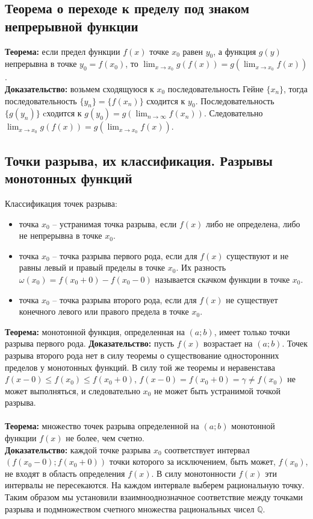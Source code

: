 \documentclass{article}
\newcommand{\theorem}{\textbf{Теорема:} }
\newcommand{\proof}{\textbf{Доказательство:} }
\newcommand{\intr}[2]{$(#1;#2)$}
\newcommand{\Q}{$\mathbb{Q}$}
\begin{document}
    \subsection*{Теорема о переходе к пределу под знаком непрерывной функции}       
        \textbf{Теорема:} если предел функции $f(x)$ точке $x_0$ равен $y_0$, а функция $g(y)$ непрерывна в точке $y_0 = f(x_0)$, то
        $\lim_{x \to x_0} g(f(x)) = g \left(\lim_{x \to x_0} f(x) \right)$.
        \\
        \textbf{Доказательство:}
        возьмем сходящуюся к $x_0$ последовательность Гейне $\{x_n\}$, тогда последовательность $\{y_n\} = \{f(x_n)\}$ сходится к $y_0$.
        Последовательность $\{g(y_n)\}$ cходится к $g(y_0) = g(\lim_{n \to \infty} f(x_n))$.
        Следовательно $\lim_{x \to x_0} g(f(x)) = g \left(\lim_{x \to x_0} f(x) \right)$.


    \subsection*{Точки разрыва, их классификация. Разрывы монотонных функций}
        Классификация точек разрыва:
        \begin{itemize}
            \item точка $x_0$ -- устранимая точка разрыва, если $f(x)$ либо не определена, либо не непрерывна в точке $x_0$.
            \item точка $x_0$ -- точка разрыва первого рода, если для $f(x)$ существуют и не равны левый и правый пределы в точке $x_0$.
            Их разность $\omega(x_0) = f(x_0 + 0) - f(x_0 - 0)$ называется скачком функции в точке $x_0$.
            \item точка $x_0$ -- точка разрыва второго рода, если для $f(x)$ не существует конечного левого или правого предела в точке $x_0$.
        \end{itemize}
        \theorem монотонной функция, определенная на \intr{a}{b}, имеет только точки разрыва первого рода.
        \proof пусть $f(x)$ возрастает на \intr{a}{b}. Точек разрыва второго рода нет в силу теоремы о существование односторонних пределов у монотонных функций.
        В силу той же теоремы и неравенстава $f(x - 0) \le f(x_0) \le f(x_0 + 0)$, 
        $f(x - 0) = f(x_0 + 0) = \gamma \neq f(x_0)$ не может выполняться, и следовательно $x_0$ не может быть устранимой точкой разрыва.
        \\
        \\
        \theorem множество точек разрыва определенной на \intr{a}{b} монотонной функции $f(x)$ не более, чем счетно.
        \\
        \proof каждой точке разрыва $x_0$ соответствует интервал \intr{f(x_0 - 0)}{f(x_0 + 0)} точки которого за исключением, быть может, $f(x_0)$,
        не входят в область определения $f(x)$. 
        В силу монотонности $f(x)$ эти интервалы не пересекаются. На каждом интервале выберем рациональную точку.
        Таким образом мы установили взаимнооднозначное соответствие между точками разрыва и подмножеством счетного множества рациональных чисел \Q.
  
\end{document}

